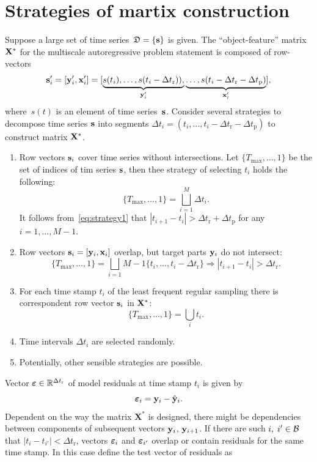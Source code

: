 \documentclass[12pt]{article}
\newcommand{\dtr}{\Delta t_\text{r}}
\newcommand{\dtp}{\Delta t_\text{p}}
\begin{document}
\section{Strategies of martix construction}
Suppose a large set of time series~${\mathfrak{D}}=\{{\mathbf{s}}\}$ is given. The ``object-feature'' matrix~${\mathbf{X}}^*$ for the multiscale autoregressive problem statement is composed of row-vectors
\[
{\mathbf{s}}_i^\prime = [{\mathbf{y}}_i^\prime, {\mathbf{x}}_i^\prime] = [\underbrace{s(t_i),\dots,s(t_i-\Delta t_\text{r})),}_{{\mathbf{y}}_i^\prime}
\underbrace{\dots,s(t_i-\Delta t_\text{r}-\Delta t_\text{p})}_{{\mathbf{x}}_i^\prime}],
\]
where~$s(t)$ is an element of time series~${\mathbf{s}}$. Consider several strategies to decompose time series ${\mathbf{s}}$ into segments $\Delta t_i = (t_i,\dots,t_i-\Delta t_\text{r}-\Delta t_\text{p})$ to construct  matrix ${\mathbf{X}}^{*}$.
\begin{enumerate}
\item Row vectors ${\mathbf{s}}_i$ cover time series without intersections. Let $\{T_{\max}, \dots, 1\}$ be the set of indices of tim series ${\mathbf{s}}$, then thee strategy of selecting $t_i$ holds the following:
\begin{equation}\label{eq:strategy1}\{T_{\max}, \dots, 1\} = \bigsqcup_{i=1}^{M} \Delta t_i.\end{equation}
It follows from~\eqref{eq:strategy1} that $|t_{i+1} - t_i| > \dtr + \dtp$ for any $i = 1, \dots, M-1$.
\item Row vectors ${\mathbf{s}}_i = [{\mathbf{y}}_i, {\mathbf{x}}_i]$ overlap, but target parts  ${\mathbf{y}}_i$ do not intersect:
    \begin{equation}\label{eq:strategy2}\{T_{\max}, \dots, 1\} = \bigsqcup_{i=1}{M-1} \{t_i,\dots,t_i-\Delta t_\text{r}\} \Rightarrow |t_{i+1} - t_i| > \dtr. \end{equation}
\item For each time stamp $t_i$ of the least frequent regular sampling there is correspondent row vector ${\mathbf{s}}_i$ in ${\mathbf{X}}^{*}$:
    \[\{T_{\max}, \dots, 1\} = \bigcup_i t_i. \]
\item Time intervals $\Delta t_i$ are selected randomly.
\item Potentially, other sensible strategies are possible.
\end{enumerate}
 Vector $\veps \in \mathbb{R}^{\dtr}$ of model residuals at time stamp $t_i$ is given by
\[{\boldsymbol{\varepsilon}}_i = {{\mathbf{y}}}_i - \hat{{\mathbf{y}}}_i.\]
Dependent on the way the matrix $\mathbf{X}^{*}$ is designed, there might be dependencies between components of subsequent vectors ${\mathbf{y}}_{i}$, ${\mathbf{y}}_{i+1}$.
If there are such $i, \; i' \in {\mathcal{B}}$ that $|t_i - t_{i'}| < \dtr$, vectors ${\boldsymbol{\varepsilon}}_i$ and ${\boldsymbol{\varepsilon}}_{i'}$ overlap or contain residuals for the same time stamp. In this case define the test vector of residuals as
\end{document}
